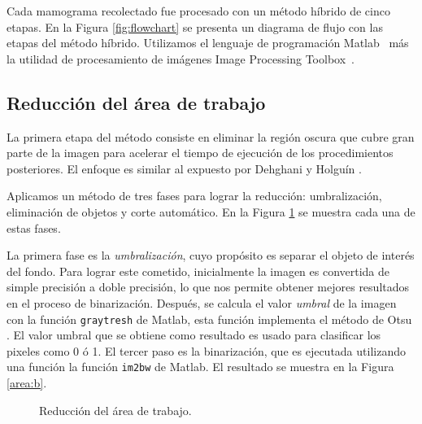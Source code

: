Cada mamograma recolectado fue procesado con un método híbrido de cinco etapas.
En la Figura \ref{fig:flowchart} se presenta un diagrama de flujo con las
etapas del método híbrido. Utilizamos el lenguaje de programación
Matlab~\cite{matlab} más la utilidad de procesamiento de imágenes Image
Processing Toolbox~\cite{ipt}.

\shorthandoff{>} %
    
\shorthandon{>} 

\subsection{Reducción del área de trabajo}

La primera etapa del método consiste en eliminar la región oscura que cubre
gran parte de la imagen para acelerar el tiempo de ejecución de los
procedimientos posteriores. El enfoque es similar al expuesto por Dehghani y
Holguín \cite{dehghani2011method, holguinpre}.

Aplicamos un método de tres fases para lograr la reducción: umbralización,
eliminación de objetos y corte automático. En la Figura \ref{reduction} se
muestra cada una de estas fases. 

La primera fase es la \textit{umbralización}, cuyo propósito es separar el
objeto de interés del fondo. Para lograr este cometido, inicialmente la imagen
es convertida de simple precisión a doble precisión, lo que nos permite obtener
mejores resultados en el proceso de binarización. Después, se calcula el valor
\textit{umbral} de la imagen con la función \texttt{graytresh} de Matlab, esta
función implementa el método de Otsu \cite{otsumethod}. El valor umbral que se
obtiene como resultado es usado para clasificar los pixeles como 0 ó 1. El
tercer paso es la binarización, que es ejecutada utilizando una función la
función \texttt{im2bw} de Matlab. El resultado se muestra en la Figura
\ref{area:b}.

\begin{figure}[h]
    \centering


    \bigskip
    

  \caption[Reducción del área de trabajo]
  {Reducción del área de trabajo.}
  \label{reduction}
\end{figure}

